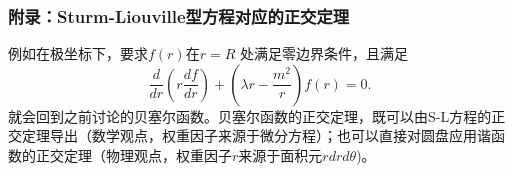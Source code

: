 \documentclass[CJK]{beamer}
\begin{document}
\begin{frame}
  \frametitle{附录：Sturm-Liouville型方程对应的正交定理}
  例如在极坐标下，要求$f(r)$在$r=R$ 处满足零边界条件，且满足
  $$ \frac{d}{dr}\left(r\frac{df}{dr}\right) + \left(\lambda r-\frac{m^2}{r}\right)f(r) = 0.$$
  就会回到之前讨论的贝塞尔函数。贝塞尔函数的正交定理，既可以由S-L方程的正交定理导出（数学观点，权重因子来源于微分方程）；也可以直接对圆盘应用谐函数的正交定理（物理观点，权重因子$r$来源于面积元$rdrd\theta$)。
\end{frame}

\ech
\end{document}
